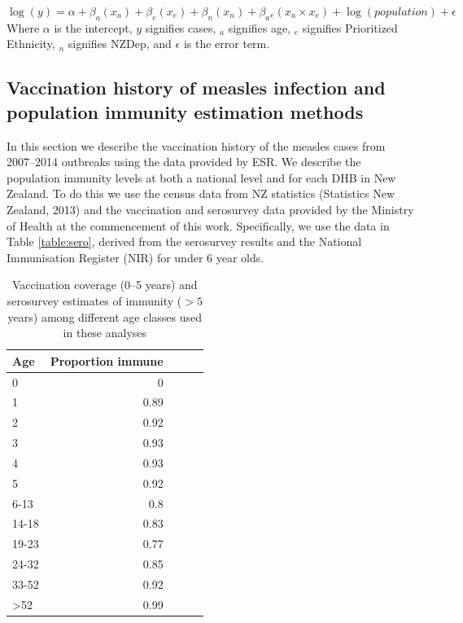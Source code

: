 \documentclass{article}
\begin{document}
\begin{equation} \label{eq:reg}
 \log(y) = \alpha + \beta _a (x_a)+ \beta _e(x_e)+ \beta _n (x_n) + \beta _a{}_e(x_a \times x_e)+ \log(population)  + \epsilon
  \end{equation}
Where $\alpha$ is the intercept, $y$ signifies cases, $_a$ signifies age, $_e$ signifies Prioritized Ethnicity, $_n$ signifies NZDep, and $\epsilon$ is the error term.



\subsection{Vaccination history of measles infection and population immunity estimation methods}
\label{sub:immunestat}

In this section we describe the vaccination history of the measles cases from 2007--2014 outbreaks using the data provided by ESR. We describe the population immunity levels at both a national level and for each DHB in New Zealand. To do this we use the census data from NZ statistics (Statistics New Zealand, 2013) and the vaccination and serosurvey data provided by the Ministry of Health at the commencement of this work. Specifically, we use the data in Table \autoref{table:sero}, derived from the serosurvey results and the National Immunisation Register (NIR) for under 6 year olds.

\begin{table}[htdp]
\begin{center}
\begin{tabular}{lrrrr}
\hline
Age &  Proportion immune\\
\hline
0  & 0\\
1  & 0.89\\
2	& 0.92\\
3	& 0.93\\
4	& 0.93\\
5	& 0.92\\
6-13	& 0.8\\
14-18	& 0.83\\
19-23	& 0.77\\
24-32	& 0.85\\
33-52	& 0.92\\
>52	& 0.99\\
\hline
\end{tabular}
\end{center}
\caption{Vaccination coverage (0--5 years) and serosurvey estimates of immunity ($>5$ years) among different age classes used in these analyses}
\label{table:sero}
\end{table}%
\end{document}
